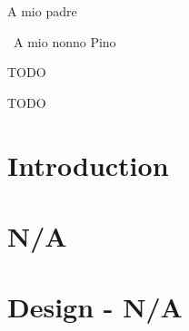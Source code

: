 \documentclass[%
  cucitura%
  ,english
  ,12pt%
  ,openright
  ]{toptesi}
\begin{document}

%



\frontespizio
\paginavuota
\newpage
\advance\voffset -5mm
\advance\textheight 30mm

\begin{dedica}
A mio padre

\textdagger\ A mio nonno Pino
\end{dedica}

\sommario
TODO

\ringraziamenti

TODO



\indici

\mainmatter

\chapter{Introduction}



\chapter{N/A}


\chapter{Design - N/A}
\end{document}
